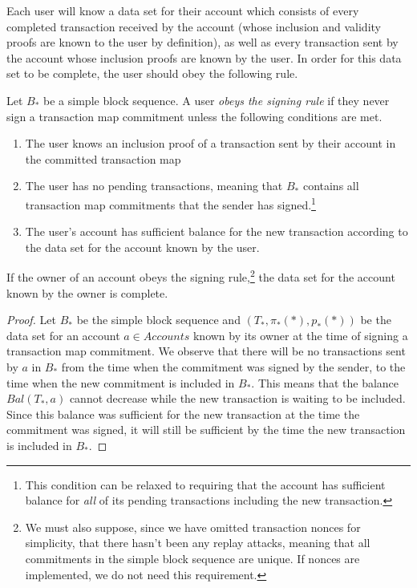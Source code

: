 Each user will know a data set for their account which consists of every completed transaction received by the account (whose inclusion and validity proofs are known to the user by definition), as well as every transaction sent by the account whose inclusion proofs are known by the user. In order for this data set to be complete, the user should obey the following rule.

\begin{defn}
  Let \(B_*\) be a simple block sequence. A user \emph{obeys the signing rule} if they never sign a transaction map commitment unless the following conditions are met.
\begin{enumerate}
    \item The user knows an inclusion proof of a transaction sent by their account in the committed transaction map
    \item The user has no pending transactions, meaning that \(B_*\) contains all transaction map commitments that the sender has signed.\footnote{This condition can be relaxed to requiring that the account has sufficient balance for \emph{all} of its pending transactions including the new transaction.}
    \item The user's account has sufficient balance for the new transaction according to the data set for the account known by the user.
\end{enumerate}
\end{defn}

\begin{theorem}\label{theorem:protocol-rule-implies-preconditions}
  If the owner of an account obeys the signing rule,\footnote{We must also suppose, since we have omitted transaction nonces for simplicity, that there hasn't been any replay attacks, meaning that all commitments in the simple block sequence are unique. If nonces are implemented, we do not need this requirement.} the data set for the account known by the owner is complete.
\end{theorem}

\begin{proof}
  Let \(B_*\) be the simple block sequence and \((T_*,\pi_*(*), p_*(*))\) be the data set for an account \(a \in Accounts\) known by its owner at the time of signing a transaction map commitment. We observe that there will be no transactions sent by \(a\) in \(B_*\) from the time when the commitment was signed by the sender, to the time when the new commitment is included in \(B_*\). This means that the balance \(Bal(T_*,a)\) cannot decrease while the new transaction is waiting to be included. Since this balance was sufficient for the new transaction at the time the commitment was signed, it will still be sufficient by the time the new transaction is included in \(B_*\).
\end{proof}

